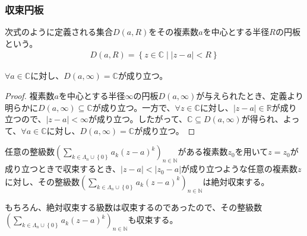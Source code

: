 \documentclass[dvipdfmx]{jsarticle}
\begin{document}
\subsubsection{収束円板}%
\begin{dfn}
次式のように定義される集合$D(a,R)$をその複素数$a$を中心とする半径$R$の円板という。
\begin{align*}
D(a,R) = \left\{ z \in \mathbb{C} \middle| |z - a| < R \right\}
\end{align*}
\end{dfn}
\begin{thm}\label{4.1.13.2}
$\forall a \in \mathbb{C}$に対し、$D(a,\infty) = \mathbb{C}$が成り立つ。
\end{thm}
\begin{proof}
複素数$a$を中心とする半径$\infty$の円板$D(a,\infty)$が与えられたとき、定義より明らかに$D(a,\infty) \subseteq \mathbb{C}$が成り立つ。一方で、$\forall z \in \mathbb{C}$に対し、$|z - a| \in \mathbb{R}$が成り立つので、$|z - a| < \infty$が成り立つ。したがって、$\mathbb{C} \subseteq D(a,\infty)$が得られ、よって、$\forall a \in \mathbb{C}$に対し、$D(a,\infty) = \mathbb{C}$が成り立つ。
\end{proof}
\begin{thm}\label{4.1.13.3}
任意の整級数$\left( \sum_{k \in \varLambda_{n} \cup \left\{ 0 \right\}} {a_{k}(z - a)^{k}} \right)_{n \in \mathbb{N}}$がある複素数$z_{0}$を用いて$z = z_{0}$が成り立つときで収束するとき、$|z - a| < \left| z_{0} - a \right|$が成り立つような任意の複素数$z$に対し、その整級数$\left( \sum_{k \in \varLambda_{n} \cup \left\{ 0 \right\}} {a_{k}(z - a)^{k}} \right)_{n \in \mathbb{N}}$は絶対収束する。
\end{thm}\par
もちろん、絶対収束する級数は収束するのであったので、その整級数$\left( \sum_{k \in \varLambda_{n} \cup \left\{ 0 \right\}} {a_{k}(z - a)^{k}} \right)_{n \in \mathbb{N}}$も収束する。
\end{document}
